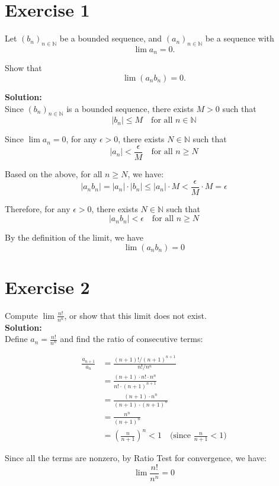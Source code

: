 \documentclass{article}
\begin{document}
\section*{Exercise 1}
Let $(b_n)_{n \in \mathbb{N}}$ be a bounded sequence, and $(a_n)_{n \in \mathbb{N}}$ be a sequence with 
\[\lim a_n = 0.\]

Show that 
\[\lim(a_n b_n) = 0.\]

\textbf{Solution:} \\

Since $(b_n)_{n \in \mathbb{N}}$ is a bounded sequence, there exists $M > 0$ such that
\[|b_n| \leq M \quad \text{for all } n \in \mathbb{N}\]

Since $\lim a_n = 0$, for any $\epsilon > 0$, there exists $N \in \mathbb{N}$ such that
\[|a_n| < \frac{\epsilon}{M} \quad \text{for all } n \geq N\]

Based on the above, for all $n \geq N$, we have:
\[|a_n b_n| = |a_n| \cdot |b_n| \leq |a_n| \cdot M < \frac{\epsilon}{M} \cdot M = \epsilon\]

Therefore, for any $\epsilon > 0$, there exists $N \in \mathbb{N}$ such that
\[|a_n b_n| < \epsilon \quad \text{for all } n \geq N\]

By the definition of the limit, we have
\[\lim(a_n b_n) = 0\]

\newpage

\section*{Exercise 2}
Compute $\lim \frac{n!}{n^n}$, or show that this limit does not exist. \\

\textbf{Solution:} \\

Define $a_n = \frac{n!}{n^n}$ and find the ratio of consecutive terms:

\begin{align*}
\frac{a_{n+1}}{a_n} &= \frac{(n+1)!/(n+1)^{n+1}}{n!/n^n} \\
&= \frac{(n+1) \cdot n! \cdot n^n}{n! \cdot (n+1)^{n+1}} \\
&= \frac{(n+1) \cdot n^n}{(n+1) \cdot (n+1)^n} \\
&= \frac{n^n}{(n+1)^n} \\
&= \left(\frac{n}{n+1}\right)^n < 1 \quad \text{(since $\frac{n}{n+1} < 1$)}
\end{align*}

Since all the terms are nonzero, by Ratio Test for convergence, we have:
\[
\lim \frac{n!}{n^n} = 0
\]
\end{document}
